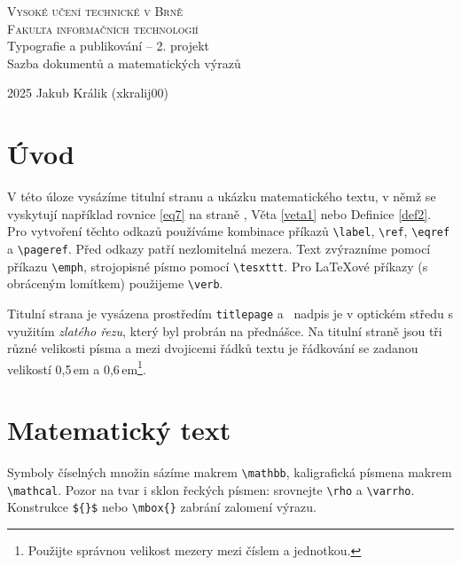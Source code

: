 \documentclass[a4paper, 11pt, twocolumn]{article}
\theoremstyle{definition}
\theoremstyle{definition}
\begin{document}
\thispagestyle{empty}


\begin{titlepage}
\begin{center}
    
    \Huge{
    \textsc{
    Vysoké učení technické v Brně\\[0.5em]}
    }
    \huge{
    \textsc{
    Fakulta informačních technologií}\\
    }
    {\LARGE
    Typografie a publikování -- 2. projekt\\[0.6em]
    Sazba dokumentů a matematických výrazů\\
    }
\end{center}

{\Large 2025 \hfill
Jakub Králik (xkralij00)}

\end{titlepage}


\section*{Úvod}
V této úloze vysázíme titulní stranu a ukázku matematického textu,
v němž se vyskytují například
rovnice \eqref{eq7} na straně \pageref{def2}, Věta \ref{veta1} nebo Definice \ref{def2}.
Pro vytvoření těchto odkazů používáme kombinace příkazů
\texttt{\textbackslash label}, \texttt{\textbackslash ref}, \texttt{\textbackslash eqref} a \texttt{\textbackslash pageref}.
Před odkazy patří nezlomitelná mezera.
Text zvýrazníme pomocí příkazu \texttt{\textbackslash emph}, strojopisné písmo pomocí \texttt{\textbackslash tesxttt}.
Pro \LaTeX ové příkazy (s obráceným lomítkem) použijeme \texttt{\textbackslash verb}.

Titulní strana je vysázena prostředím \texttt{titlepage} a~ nadpis je v optickém středu
s využitím \emph{zlatého řezu}, který byl probrán na přednášce.
Na titulní straně jsou tři různé velikosti písma a mezi dvojicemi řádků textu
je řádkování se zadanou  velikostí 0,5\,em a 0,6\,em\footnote{Použijte správnou velikost mezery mezi číslem a jednotkou.}.

\section{Matematický text}
Symboly číselných množin sázíme makrem \texttt{\textbackslash mathbb},
kaligrafická písmena  makrem \texttt{\textbackslash mathcal}.
Pozor na tvar i sklon řeckých písmen: srovnejte \texttt{\textbackslash rho} a \texttt{\textbackslash varrho}.
Konstrukce \texttt{\$\{\}\$} nebo \texttt{\textbackslash mbox\{\}} zabrání zalomení výrazu.
\end{document}
